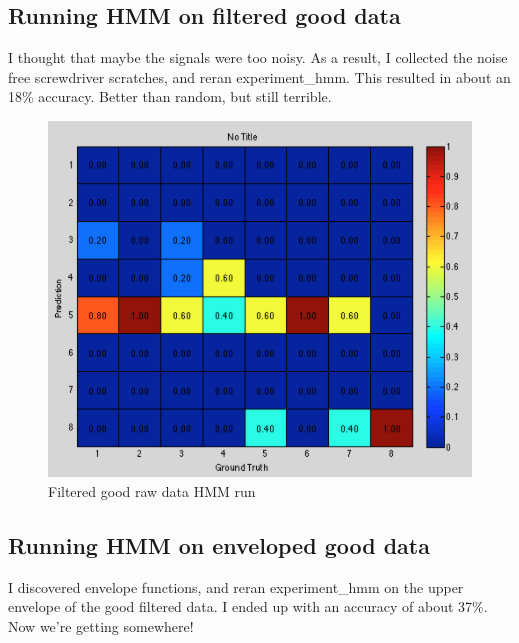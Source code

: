 \documentclass[12pt]{article}
\begin{document}
\FloatBarrier
\subsection{Running HMM on filtered good data}
I thought that maybe the signals were too noisy. As a result, I collected the noise free screwdriver scratches, and reran experiment\_hmm. This resulted in about an 18\% accuracy. Better than random, but still terrible.

\begin{figure}[h!]
\centering
\includegraphics[scale=0.6]{filteredhmm.png}
\caption{Filtered good raw data HMM run}
\end{figure}

\FloatBarrier
\subsection{Running HMM on enveloped good data}
I discovered envelope functions, and reran experiment\_hmm on the upper envelope of the good filtered data. I ended up with an accuracy of about 37\%. Now we're getting somewhere!
\end{document}
